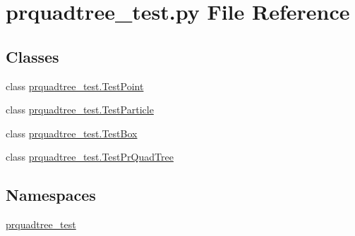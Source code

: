 \section{prquadtree\+\_\+test.\+py File Reference}
\label{prquadtree__test_8py}
\subsection*{Classes}
\begin{DoxyCompactItemize}
\item 
class \hyperlink{classprquadtree__test_1_1TestPoint}{prquadtree\+\_\+test.\+Test\+Point}
\item 
class \hyperlink{classprquadtree__test_1_1TestParticle}{prquadtree\+\_\+test.\+Test\+Particle}
\item 
class \hyperlink{classprquadtree__test_1_1TestBox}{prquadtree\+\_\+test.\+Test\+Box}
\item 
class \hyperlink{classprquadtree__test_1_1TestPrQuadTree}{prquadtree\+\_\+test.\+Test\+Pr\+Quad\+Tree}
\end{DoxyCompactItemize}
\subsection*{Namespaces}
\begin{DoxyCompactItemize}
\item 
 \hyperlink{namespaceprquadtree__test}{prquadtree\+\_\+test}
\end{DoxyCompactItemize}
